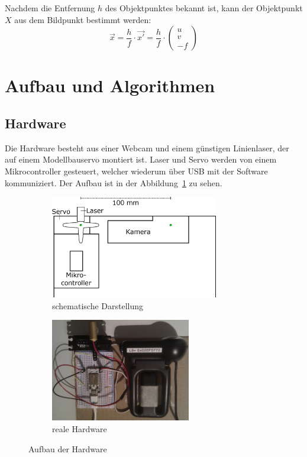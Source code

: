 \documentclass[ngerman,a4paper,parskip=half]{scrartcl}
\begin{document}
Nachdem die Entfernung $h$ des Objektpunktes bekannt ist, kann der Objektpunkt $X$ aus dem Bildpunkt bestimmt werden:
\[ \vec{x} = \frac{h}{f} \cdot \vec{x'} = \frac{h}{f} \cdot \begin{pmatrix}
u \\ v \\ -f
\end{pmatrix} \]


\section{Aufbau und Algorithmen}
\label{sec:realization}

\subsection{Hardware}

Die Hardware besteht aus einer Webcam und einem günstigen Linienlaser, der auf einem Modellbauservo montiert ist. Laser und Servo werden von einem Mikrocontroller gesteuert, welcher wiederum über USB mit der Software kommuniziert. Der Aufbau ist in der Abbildung~\ref{fig:hardware} zu sehen.

\begin{figure}
	\centering
	\begin{subfigure}{0.45\textwidth}
		\includegraphics[height=4.5cm]{includes/hardware_schematic}
		\caption{schematische Darstellung}
	\end{subfigure}
	\hfill
	\begin{subfigure}{0.4\textwidth}
		\includegraphics[height=4.5cm]{includes/hardware}
		\caption{reale Hardware}
	\end{subfigure}
	\caption{Aufbau der Hardware}
	\label{fig:hardware}
\end{figure}
\end{document}
